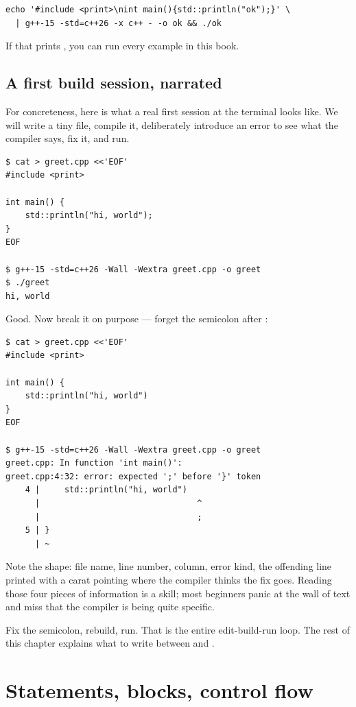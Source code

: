 \begin{lstlisting}[style=shell]
echo '#include <print>\nint main(){std::println("ok");}' \
  | g++-15 -std=c++26 -x c++ - -o ok && ./ok
\end{lstlisting}

If that prints , you can run every example in this book.

\subsection{A first build session, narrated}

For concreteness, here is what a real first session at the terminal
looks like. We will write a tiny \cpp{} file, compile it, deliberately
introduce an error to see what the compiler says, fix it, and run.

\begin{lstlisting}[style=shell]
$ cat > greet.cpp <<'EOF'
#include <print>

int main() {
    std::println("hi, world");
}
EOF

$ g++-15 -std=c++26 -Wall -Wextra greet.cpp -o greet
$ ./greet
hi, world
\end{lstlisting}

Good. Now break it on purpose --- forget the semicolon after
:

\begin{lstlisting}[style=shell]
$ cat > greet.cpp <<'EOF'
#include <print>

int main() {
    std::println("hi, world")
}
EOF

$ g++-15 -std=c++26 -Wall -Wextra greet.cpp -o greet
greet.cpp: In function 'int main()':
greet.cpp:4:32: error: expected ';' before '}' token
    4 |     std::println("hi, world")
      |                                ^
      |                                ;
    5 | }
      | ~
\end{lstlisting}

Note the shape: file name, line number, column, error kind, the
offending line printed with a carat pointing where the compiler
thinks the fix goes. Reading those four pieces of information is a
skill; most beginners panic at the wall of text and miss that the
compiler is being quite specific.

Fix the semicolon, rebuild, run. That is the entire edit-build-run
loop. The rest of this chapter explains what to write between
 and \code{\}}.

\section{Statements, blocks, control flow}
\label{sec:cpp:flow}

